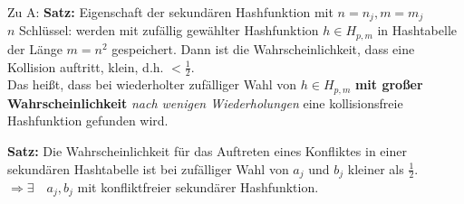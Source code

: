 \documentclass[fleqn]{scrartcl}
\begin{document}
Zu A: \textbf{Satz:} Eigenschaft der sekundären Hashfunktion mit $n =  n_j, m = m_j$\\

$n$ Schlüssel: werden mit zufällig gewählter Hashfunktion $h \in H_{p,m}$ in Hashtabelle der Länge $m = n^2$ gespeichert. Dann ist die Wahrscheinlichkeit, dass eine Kollision auftritt, klein, d.h. $< \frac{1}{2}$.\\

Das heißt, dass bei wiederholter zufälliger Wahl von $h \in H_{p, m}$ \textbf{mit großer Wahrscheinlichkeit} \textit{nach wenigen Wiederholungen} eine kollisionsfreie Hashfunktion gefunden wird.


\textbf{Satz:} Die Wahrscheinlichkeit für das Auftreten eines Konfliktes in einer sekundären Hashtabelle ist bei zufälliger Wahl von $a_j$ und $b_j$ kleiner als $\frac{1}{2}$.\\
$\Rightarrow \exists \quad a_j, b_j$ mit konfliktfreier sekundärer Hashfunktion.\\\\
\end{document}
